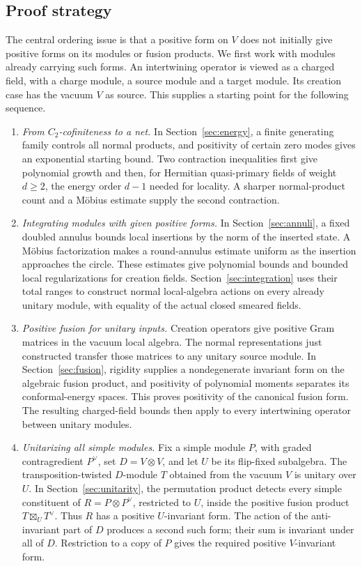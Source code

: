 \documentclass[11pt]{article}
\numberwithin{equation}{section}
\theoremstyle{definition}
\theoremstyle{remark}
\begin{document}
\subsection{Proof strategy}

The central ordering issue is that a positive form on $V$ does not initially give positive forms on its modules or fusion products. We first work with modules already carrying such forms. An intertwining operator is viewed as a charged field, with a charge module, a source module and a target module. Its creation case has the vacuum $V$ as source. This supplies a starting point for the following sequence.
\begin{enumerate}
\item \emph{From $C_2$-cofiniteness to a net.} In Section~\ref{sec:energy}, a finite generating family controls all normal products, and positivity of certain zero modes gives an exponential starting bound. Two contraction inequalities first give polynomial growth and then, for Hermitian quasi-primary fields of weight $d\geq2$, the energy order $d-1$ needed for locality. A sharper normal-product count and a M\"obius estimate supply the second contraction.
\item \emph{Integrating modules with given positive forms.} In Section~\ref{sec:annuli}, a fixed doubled annulus bounds local insertions by the norm of the inserted state. A M\"obius factorization makes a round-annulus estimate uniform as the insertion approaches the circle. These estimates give polynomial bounds and bounded local regularizations for creation fields. Section~\ref{sec:integration} uses their total ranges to construct normal local-algebra actions on every already unitary module, with equality of the actual closed smeared fields.
\item \emph{Positive fusion for unitary inputs.} Creation operators give positive Gram matrices in the vacuum local algebra. The normal representations just constructed transfer those matrices to any unitary source module. In Section~\ref{sec:fusion}, rigidity supplies a nondegenerate invariant form on the algebraic fusion product, and positivity of polynomial moments separates its conformal-energy spaces. This proves positivity of the canonical fusion form. The resulting charged-field bounds then apply to every intertwining operator between unitary modules.
\item \emph{Unitarizing all simple modules.} Fix a simple module $P$, with graded contragredient $P^\vee$, set $D=V\otimes V$, and let $U$ be its flip-fixed subalgebra. The transposition-twisted $D$-module $T$ obtained from the vacuum $V$ is unitary over $U$. In Section~\ref{sec:unitarity}, the permutation product detects every simple constituent of $R=P\otimes P^\vee$, restricted to $U$, inside the positive fusion product $T\boxtimes_U T^\vee$. Thus $R$ has a positive $U$-invariant form. The action of the anti-invariant part of $D$ produces a second such form; their sum is invariant under all of $D$. Restriction to a copy of $P$ gives the required positive $V$-invariant form.

\end{enumerate}
\end{document}
